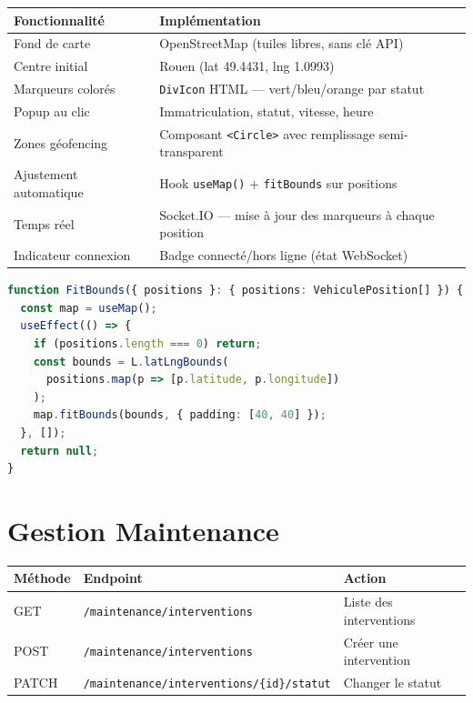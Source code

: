\documentclass[12pt,a4paper]{report}
\begin{document}
\begin{center}
\begin{tabular}{|l|l|}
  \hline
  \rowcolor{lightblue}
  \textbf{Fonctionnalité} & \textbf{Implémentation} \\
  \hline
  Fond de carte          & OpenStreetMap (tuiles libres, sans clé API) \\
  Centre initial         & Rouen (lat 49.4431, lng 1.0993) \\
  Marqueurs colorés      & \texttt{DivIcon} HTML — vert/bleu/orange par statut \\
  Popup au clic          & Immatriculation, statut, vitesse, heure \\
  Zones géofencing       & Composant \texttt{<Circle>} avec remplissage semi-transparent \\
  Ajustement automatique & Hook \texttt{useMap()} + \texttt{fitBounds} sur positions \\
  Temps réel             & Socket.IO — mise à jour des marqueurs à chaque position \\
  Indicateur connexion   & Badge connecté/hors ligne (état WebSocket) \\
  \hline
\end{tabular}
\end{center}

\begin{lstlisting}[style=code, language=TypeScript, caption=Composant FitBounds — ajustement automatique du zoom]
function FitBounds({ positions }: { positions: VehiculePosition[] }) {
  const map = useMap();
  useEffect(() => {
    if (positions.length === 0) return;
    const bounds = L.latLngBounds(
      positions.map(p => [p.latitude, p.longitude])
    );
    map.fitBounds(bounds, { padding: [40, 40] });
  }, []);
  return null;
}
\end{lstlisting}

\section{Gestion Maintenance}

\begin{center}
\begin{tabular}{|l|l|l|}
  \hline
  \rowcolor{lightblue}
  \textbf{Méthode} & \textbf{Endpoint} & \textbf{Action} \\
  \hline
  GET   & \texttt{/maintenance/interventions}              & Liste des interventions \\
  POST  & \texttt{/maintenance/interventions}              & Créer une intervention \\
  PATCH & \texttt{/maintenance/interventions/\{id\}/statut} & Changer le statut \\
  \hline
\end{tabular}
\end{center}
\end{document}
